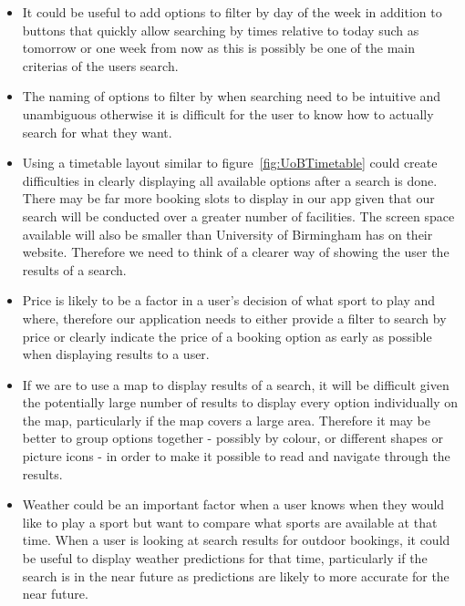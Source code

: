 \begin{itemize}
        \item It could be useful to add options to filter by day of the week in addition to buttons that quickly allow searching by times relative to today such as tomorrow or one week from now as this is possibly be one of the main criterias of the users search.
        \item The naming of options to filter by when searching need to be intuitive and unambiguous otherwise it is difficult  for the user to know how to actually search for what they want.
        \item Using a timetable layout similar to figure~\ref{fig:UoBTimetable} could create difficulties in clearly displaying all available options after a search is done. There may be far more booking slots to display in our app given that our search will be conducted over a greater number of facilities. The screen space available will also be smaller than University of Birmingham has on their website. Therefore we need to think of a clearer way of showing the user the results of a search.
        \item Price is likely to be a factor in a user's decision of what sport to play and where, therefore our application needs to either provide a filter to search by price or clearly indicate the price of a booking option as early as possible when displaying results to a user.
        \item If we are to use a map to display results of a search, it will be difficult given the potentially large number of results to display every option individually on the map, particularly if the map covers a large area. Therefore it may be better to group options together - possibly by colour, or different shapes or picture icons - in order to make it possible to read and navigate through the results.
        \item Weather could be an important factor when a user knows when they would like to play a sport but want to compare what sports are available at that time. When a user is looking at search results for outdoor bookings, it could be useful to display weather predictions for that time, particularly if the search is in the near future as predictions are likely to more accurate for the near future.
\end{itemize}
